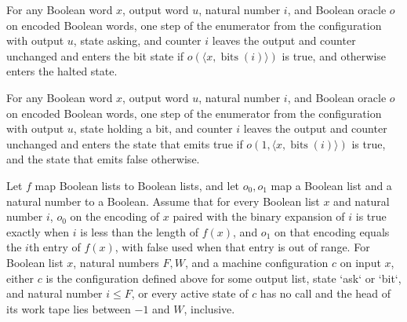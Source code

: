 \begin{lemma}
\label{Complexity.ImplicitEnum.rstep_ask}
\leanok
{}
For any Boolean word $x$, output word $u$, natural number $i$, and Boolean oracle $o$ on
encoded Boolean words, one step of the enumerator from the configuration with output
$u$, state asking, and counter $i$ leaves the output and counter unchanged and enters
the bit state if $o(\langle x,\operatorname{bits}(i)\rangle)$ is true, and otherwise
enters the halted state.
\end{lemma}

\begin{lemma}
\label{Complexity.ImplicitEnum.rstep_bit}
\leanok
{}
For any Boolean word $x$, output word $u$, natural number $i$, and Boolean oracle $o$ on
encoded Boolean words, one step of the enumerator from the configuration with output
$u$, state holding a bit, and counter $i$ leaves the output and counter unchanged and
enters the state that emits true if $o(1,\langle x,\operatorname{bits}(i)\rangle)$ is
true, and the state that emits false otherwise.
\end{lemma}

\begin{definition}
\label{Complexity.ImplicitEnum.Shape}
\leanok
{}
Let $f$ map Boolean lists to Boolean lists, and let $o_0,o_1$ map a Boolean list and a
natural number to a Boolean. Assume that for every Boolean list $x$ and natural number
$i$, $o_0$ on the encoding of $x$ paired with the binary expansion of $i$ is true
exactly when $i$ is less than the length of $f(x)$, and $o_1$ on that encoding equals
the $i$th entry of $f(x)$, with false used when that entry is out of range. For Boolean
list $x$, natural numbers $F,W$, and a machine configuration $c$ on input $x$, either
$c$ is the configuration defined above for some output list, state `ask` or `bit`, and
natural number $i\le F$, or every active state of $c$ has no call and the head of its
work tape lies between $-1$ and $W$, inclusive.
\end{definition}

